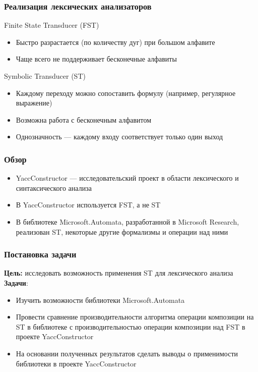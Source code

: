 \documentclass{beamer}
\begin{document}
\begin{frame}[fragile]
  \transwipe[direction=90]
  \frametitle{Реализация лексических анализаторов}
  \textbf{}Finite State Transducer (FST)
  \begin{itemize}
    \item Быстро разрастается (по количеству дуг) при большом алфавите
    \item Чаще всего не поддерживает бесконечные алфавиты
  \end{itemize}
  \vspace{5mm}
  \textbf{}Symbolic Transducer (ST)
  \begin{itemize}
    \item Каждому переходу можно сопоставить формулу (например, регулярное выражение)
    \item Возможна работа с бесконечным алфавитом
    \item Однозначность — каждому входу соответствует только один выход
  \end{itemize}
\end{frame}

\begin{frame}[fragile]
  \transwipe[direction=90]
  \frametitle{Обзор}
  \begin{itemize}
    \item YaccConstructor — исследовательский проект в области лексического и синтаксического анализа
    \item В YaccConstructor используется FST, а не ST
    \item В библиотеке Microsoft.Automata, разработанной в Microsoft Research, реализован ST, некоторые другие формализмы и операции над ними
  \end{itemize}
\end{frame}

\begin{frame}
  \transwipe[direction=90]
  \frametitle{Постановка задачи}
  \textbf{Цель:} исследовать возможность применения ST для лексического анализа \\
  \vspace{5mm}
  \textbf{Задачи}:
  \begin{itemize}
  \item Изучить возможности библиотеки Microsoft.Automata
  \item Провести сравнение производительности алгоритма операции композиции на ST в библиотеке с производительностью операции композиции над FST в проекте YaccConstructor
  \item На основании полученных результатов сделать выводы о применимости библиотеки в проекте YaccConstructor
  \end{itemize}
\end{frame}
\end{document}
